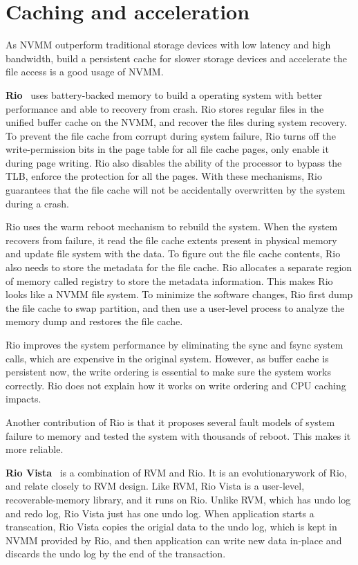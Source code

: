 \section{Caching and acceleration} 
\label{sec:caching}

As NVMM outperform traditional storage devices with low latency and high
bandwidth, build a persistent cache for slower storage devices and
accelerate the file access is a good usage of NVMM. 

\textbf{Rio}~\cite{riofilecache} uses battery-backed memory to build a
operating system
with better performance and able to recovery from crash. Rio stores regular
files in the unified buffer cache on the NVMM, and recover the files
during system recovery.
To prevent the file
cache from corrupt during system failure, Rio turns off the write-permission
bits in the page table for all file cache pages, only enable it during page
writing. Rio also disables the ability of the processor to bypass the TLB,
enforce the protection for all the pages. With these mechanisms, Rio guarantees
that the file cache will not be accidentally overwritten by the system during
a crash.

Rio uses the warm reboot mechanism to rebuild the system. When the system 
recovers from failure, it read the file cache extents present in physical memory
and update file system with the data. To figure out the file cache contents,
Rio also needs to store the metadata for the file cache. Rio allocates a
separate region of memory called registry to store the metadata information.
This makes Rio looks like a NVMM file system.
To minimize the software changes, Rio first dump the file cache to swap
partition, and then use a user-level process to analyze the memory dump
and restores the file cache.

Rio improves the system performance by eliminating the sync and fsync system
calls, which are expensive in the original system. However, as buffer cache
is persistent now, the write ordering is essential to make sure the system
works correctly. Rio does not explain how it works on write ordering and CPU
caching impacts.

Another contribution of Rio is that it proposes several fault models of system
failure to memory and tested the system with thousands of reboot. This makes
it more reliable.
 
\textbf{Rio Vista}~\cite{riovista} is a combination of RVM and Rio.
It is an evolutionarywork of Rio, and relate closely to RVM design.
Like RVM, Rio Vista is a
user-level, recoverable-memory library, and it runs on Rio. Unlike RVM,
which has undo log and redo log, Rio Vista just has one undo log. When
application starts a transcation, Rio Vista copies the origial data to the 
undo log, which is kept in NVMM provided by Rio, and then application can
write new data in-place and discards the undo log by the end of the transaction.


